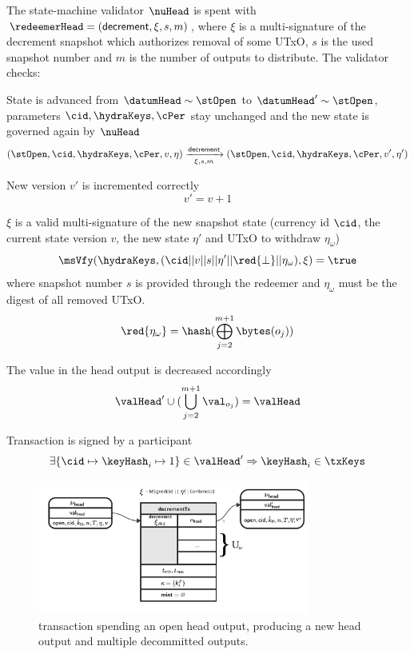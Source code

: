 \noindent The state-machine validator $\nuHead$ is spent with
$\redeemerHead = (\mathsf{decrement}, \xi, s, m)$, where $\xi$ is a multi-signature of
the decrement snapshot which authorizes removal of some UTxO, $s$ is the
used snapshot number and $m$ is the number of outputs to distribute. The
validator checks:
\begin{menumerate}
	\item State is advanced from $\datumHead \sim \stOpen$ to
	$\datumHead' \sim \stOpen$, parameters $\cid,\hydraKeys,\cPer$ stay
	unchanged and the new state is governed again by $\nuHead$
	\[
		(\stOpen,\cid,\hydraKeys,\cPer,v,\eta) \xrightarrow[\xi, s, m]{\mathsf{decrement}} (\stOpen,\cid,\hydraKeys,\cPer,v',\eta')
	\]
	\item New version $v'$ is incremented correctly
	\[
		v' = v + 1
	\]
	\item $\xi$ is a valid multi-signature of the new snapshot state (currency id $\cid$, the current state version $v$, the new state $\eta'$  and UTxO to withdraw $\eta_\omega$)
	\[
		\msVfy(\hydraKeys,(\cid || v || s || \eta' || \red{\bot} || \eta_\omega),\xi) = \true
	\]
    where snapshot number $s$ is provided through the redeemer and $\eta_\omega$ must be the digest of all removed UTxO.
	\[
		\red{\eta_\omega} = \hash(\bigoplus_{j=2}^{m+1} \bytes(o_{j}))
	\]
	\item The value in the head output is decreased accordingly
	\[
		\valHead' \cup (\bigcup_{j=2}^{m+1} \val_{o_{j}}) = \valHead
	\]
	\item Transaction is signed by a participant
	\[
		\exists \{\cid \mapsto \keyHash_{i} \mapsto 1\} \in \valHead' \Rightarrow \keyHash_{i} \in \txKeys
	\]
\end{menumerate}

\begin{figure}
	\centering
        \includegraphics[width=0.8\textwidth]{Hydra/Protocol/Figures/decrementTx.pdf}
	\caption{\mtxDecrement{} transaction spending an open head output,
		producing a new head output and multiple decommitted outputs.}\label{fig:decrementTx}
\end{figure}

